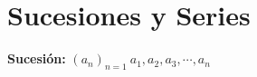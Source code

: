 \documentclass[11pt]{article}
\author{zentauro}
\date{\today}
\title{}
\begin{document}
\tableofcontents

\section{Sucesiones y Series}
\label{sec:org5862eb8}
\textbf{Sucesión:} \((a_n)_{n=1}\ a_1 , a_2 , a_3 , \cdots , a_n\)
\end{document}
